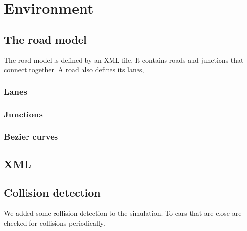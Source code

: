 
\section{Environment}
\label{sec:environment}

\subsection{The road model}
\label{sec:roadModel}

The road model is defined by an XML file. It contains roads and
junctions that connect together. A road also defines its lanes,


\subsubsection{Lanes}
\label{sec:lanes}

\subsubsection{Junctions}
\label{sec:junctions}


\subsubsection{Bezier curves}


\subsection{XML}
\label{sec:XML}


\subsection{Collision detection}

We added some collision detection to the simulation. To cars
that are close are checked for collisions periodically.

